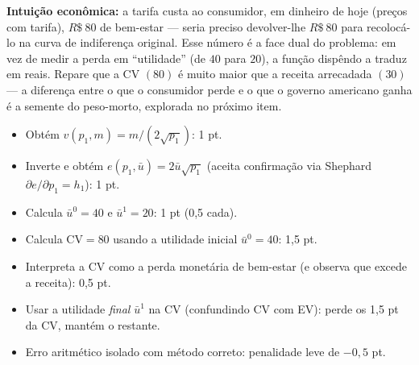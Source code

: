 \begin{solucao}
\textbf{Intuição econômica:} a tarifa custa ao consumidor, em dinheiro de hoje (preços com tarifa), $R\$~80$ de bem-estar --- seria preciso devolver-lhe $R\$~80$ para recolocá-lo na curva de indiferença original. Esse número é a face dual do problema: em vez de medir a perda em ``utilidade'' (de $40$ para $20$), a função dispêndo a traduz em reais. Repare que a CV $(80)$ é muito maior que a receita arrecadada $(30)$ --- a diferença entre o que o consumidor perde e o que o governo americano ganha é a semente do peso-morto, explorada no próximo item.
\rubricalabel
\begin{itemize}
\item Obtém $v(p_1,m)=m/(2\sqrt{p_1})$: 1 pt.
\item Inverte e obtém $e(p_1,\bar u)=2\bar u\sqrt{p_1}$ (aceita confirmação via Shephard $\partial e/\partial p_1=h_1$): 1 pt.
\item Calcula $\bar u^{0}=40$ e $\bar u^{1}=20$: 1 pt (0{,}5 cada).
\item Calcula $\mathrm{CV}=80$ usando a utilidade inicial $\bar u^{0}=40$: 1{,}5 pt.
\item Interpreta a CV como a perda monetária de bem-estar (e observa que excede a receita): 0{,}5 pt.
\item Usar a utilidade \emph{final} $\bar u^{1}$ na CV (confundindo CV com EV): perde os 1{,}5 pt da CV, mantém o restante.
\item Erro aritmético isolado com método correto: penalidade leve de $-0{,}5$ pt.
\end{itemize}
\end{solucao}

